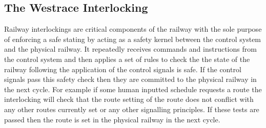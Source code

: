 \begin{comment}
The one aspect signal is typically a fixed red indicating that is not possible
to proceed down the track at this current point in time. The two - four aspect
signals are used on tracks with different speeds to convey different stopping
distances.  The two aspect signal for instance would be used on a low speed
track segment where stopping distances are relatively short. Whereas the four
aspect signal would be used on a high speed line where stopping distances are
long and the driver needs information for a greater length of track. These
signalling schemes are fixed in the UK however they are not fixed from country
to country. On the continent, for example, they may use different conventions,
colours and number of lights on each signal.
\end{comment}



\subsection{The Westrace Interlocking}

Railway interlockings are critical components of the railway with the sole purpose of enforcing a safe stating by acting as a safety kernel between the control system and the physical railway. It repeatedly receives commands and instructions from the control system and then applies a set of rules to check the the state of the railway following the application of the control signals is safe. If the control signals pass this safety check then they are committed to the physical railway in the next cycle. For example if some human inputted schedule requests a route the interlocking will check that the route setting of the route does not conflict with any other routes currently set or any other signalling principles. If these tests are passed then the route  is set in the physical railway in the next cycle.

\begin{comment}
The railway interlocking is a key component in ensuring the safety of the
railway. Its job is to apply a set of rules to the requests and commands it receives from the
control system and check whether or not the future state of the railway is safe.
If the control signals it receives do not violate the safety of the railway
then these signals are committed to the physical infrastructure. For example if
the human controller requests for a route to be set the interlocking will
process this request and ensure that it does not conflict with other routes
before allowing the command to be passed to the physical railway.
\end{comment}


